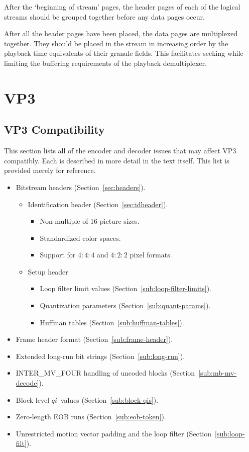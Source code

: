 \documentclass[9pt,letterpaper]{book}
\newcommand{\idx}[1]{{\ensuremath{\mathit{#1}}}}
\newcommand{\qi}{\idx{qi}}
\numberwithin{equation}{chapter}
\numberwithin{figure}{chapter}
\numberwithin{table}{chapter}
\begin{document}
After the `beginning of stream' pages, the header pages of each of
 the logical streams should be grouped together before any data pages
 occur.

After all the header pages have been placed,
 the data pages are multiplexed together.
They should be placed in the stream in increasing order by the playback
 time equivalents of their granule fields.
This facilitates seeking while limiting the buffering requirements of the
 playback demultiplexer.

\cleardoublepage
\chapter{VP3}

\section{VP3 Compatibility}
\label{app:vp3-compat}
This section lists all of the encoder and decoder issues that may affect VP3
 compatibly.
Each is described in more detail in the text itself.
This list is provided merely for reference.

\begin{itemize}
\item
Bitstream headers (Section~\ref{sec:headers}).
\begin{itemize}
\item
Identification header (Section~\ref{sec:idheader}).
\begin{itemize}
\item
Non-multiple of 16 picture sizes.
\item
Standardized color spaces.
\item
Support for $4:4:4$ and $4:2:2$ pixel formats.
\end{itemize}
\item
Setup header
\begin{itemize}
\item
Loop filter limit values (Section~\ref{sub:loop-filter-limits}).
\item
Quantization parameters (Section~\ref{sub:quant-params}).
\item
Huffman tables (Section~\ref{sub:huffman-tables}).
\end{itemize}
\end{itemize}
\item
Frame header format (Section~\ref{sub:frame-header}).
\item
Extended long-run bit strings (Section~\ref{sub:long-run}).
\item
INTER\_MV\_FOUR handling of uncoded blocks (Section~\ref{sub:mb-mv-decode}).
\item
Block-level \qi\ values (Section~\ref{sub:block-qis}).
\item
Zero-length EOB runs (Section~\ref{sub:eob-token}).
\item
Unrestricted motion vector padding and the loop filter
 (Section~\ref{sub:loop-filt}).
\end{itemize}
\end{document}
